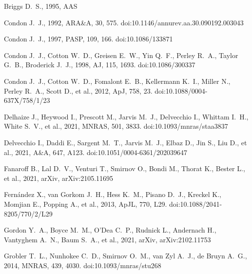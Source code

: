 \documentclass[usenatbib,usedcolumn]{mnras}
\begin{document}
\begin{thebibliography}{}
 Briggs D.~S., 1995, AAS


 Condon J.~J., 1992, ARA\&A, 30, 575. doi:10.1146/annurev.aa.30.090192.003043

 Condon J.~J., 1997, PASP, 109, 166. doi:10.1086/133871

 Condon J.~J., Cotton W.~D., Greisen E.~W., Yin Q.~F., Perley R.~A., Taylor G.~B., Broderick J.~J., 1998, AJ, 115, 1693. doi:10.1086/300337

 Condon J.~J., Cotton W.~D., Fomalont E.~B., Kellermann K.~I., Miller N., Perley R.~A., Scott D., et al., 2012, ApJ, 758, 23. doi:10.1088/0004-637X/758/1/23

 Delhaize J., Heywood I., Prescott M., Jarvis M.~J., Delvecchio I., Whittam I.~H., White S.~V., et al., 2021, MNRAS, 501, 3833. doi:10.1093/mnras/staa3837

 Delvecchio I., Daddi E., Sargent M.~T., Jarvis M.~J., Elbaz D., Jin S., Liu D., et al., 2021, A\&A, 647, A123. doi:10.1051/0004-6361/202039647

 Fanaroff B., Lal D.~V., Venturi T., Smirnov O., Bondi M., Thorat K., Bester L., et al., 2021, arXiv, arXiv:2105.11695

 Fern{\'a}ndez X., van Gorkom J.~H., Hess K.~M., Pisano D.~J., Kreckel K., Momjian E., Popping A., et al., 2013, ApJL, 770, L29. doi:10.1088/2041-8205/770/2/L29

 Gordon Y.~A., Boyce M.~M., O'Dea C.~P., Rudnick L., Andernach H., Vantyghem A.~N., Baum S.~A., et al., 2021, arXiv, arXiv:2102.11753

 Grobler T.~L., Nunhokee C.~D., Smirnov O.~M., van Zyl A.~J., de Bruyn A.~G., 2014, MNRAS, 439, 4030. doi:10.1093/mnras/stu268


\end{thebibliography}
\end{document}
